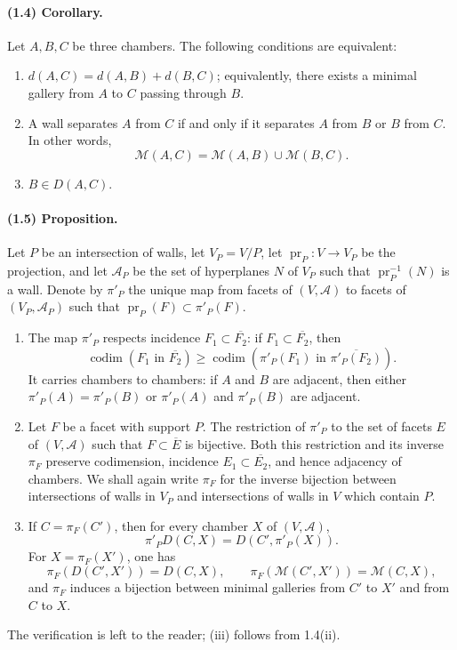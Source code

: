 \documentclass[10pt]{article}
\newcommand{\codim}{\operatorname{codim}}
\newcommand{\cl}[1]{\overline{#1}}
\newcommand{\mcA}{\mathcal A}
\newcommand{\mcM}{\mathcal M}
\begin{document}
\paragraph{(1.4) Corollary.} Let $A,B,C$ be three chambers. The following conditions are equivalent:
\begin{enumerate}[label=(\roman*)]
\item $d(A,C)=d(A,B)+d(B,C)$; equivalently, there exists a minimal gallery from $A$ to $C$ passing through $B$.
\item A wall separates $A$ from $C$ if and only if it separates $A$ from $B$ or $B$ from $C$. In other words,
\[
\mcM(A,C)=\mcM(A,B)\cup\mcM(B,C).
\]
\item $B\in D(A,C)$.
\end{enumerate}

\paragraph{(1.5) Proposition.} Let $P$ be an intersection of walls, let $V_P=V/P$, let $\operatorname{pr}_P:V\to V_P$ be the projection, and let $\mcA_P$ be the set of hyperplanes $N$ of $V_P$ such that $\operatorname{pr}_P^{-1}(N)$ is a wall. Denote by $\pi'_P$ the unique map from facets of $(V,\mcA)$ to facets of $(V_P,\mcA_P)$ such that $\operatorname{pr}_P(F)\subset\pi'_P(F)$.
\begin{enumerate}[label=(\roman*)]
\item The map $\pi'_P$ respects incidence $F_1\subset\cl{F_2}$: if $F_1\subset\cl{F_2}$, then
\[
\codim(F_1\text{ in }\cl{F_2})\ge
\codim(\pi'_P(F_1)\text{ in }\cl{\pi'_P(F_2)}).
\]
It carries chambers to chambers: if $A$ and $B$ are adjacent, then either $\pi'_P(A)=\pi'_P(B)$ or $\pi'_P(A)$ and $\pi'_P(B)$ are adjacent.
\item Let $F$ be a facet with support $P$. The restriction of $\pi'_P$ to the set of facets $E$ of $(V,\mcA)$ such that $F\subset\cl E$ is bijective. Both this restriction and its inverse $\pi_F$ preserve codimension, incidence $E_1\subset\cl{E_2}$, and hence adjacency of chambers. We shall again write $\pi_F$ for the inverse bijection between intersections of walls in $V_P$ and intersections of walls in $V$ which contain $P$.
\item If $C=\pi_F(C')$, then for every chamber $X$ of $(V,\mcA)$,
\[
\pi'_P D(C,X)=D(C',\pi'_P(X)).
\]
For $X=\pi_F(X')$, one has
\[
\pi_F(D(C',X'))=D(C,X),\qquad
\pi_F(\mcM(C',X'))=\mcM(C,X),
\]
and $\pi_F$ induces a bijection between minimal galleries from $C'$ to $X'$ and from $C$ to $X$.
\end{enumerate}
The verification is left to the reader; (iii) follows from 1.4(ii).
\end{document}
